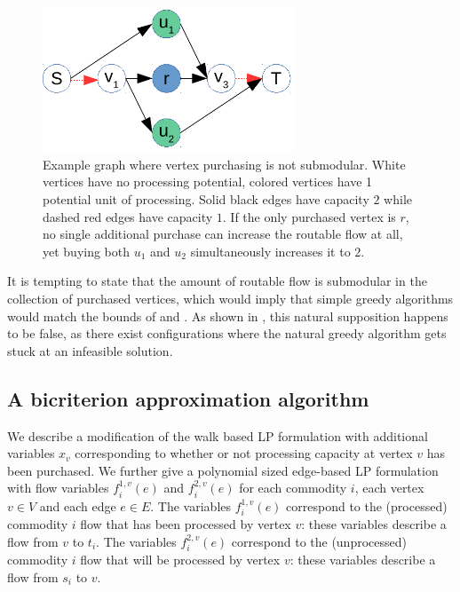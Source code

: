 \begin{figure}[t]
\centering
 \includegraphics[height=1.7in]{images/notsubmodular.pdf}
 \caption{Example graph where vertex purchasing is not submodular. White vertices have no processing potential, colored vertices have 1 potential unit of processing. Solid black edges have capacity $2$ while dashed red edges have capacity $1$. If the only purchased vertex is $r$, no single additional purchase can increase the routable flow at all, yet buying both $u_1$ and $u_2$ simultaneously increases it to $2$.}
\label{fig:notsubmodular}
\end{figure}

It is tempting to state that the amount of routable flow is submodular in the collection of purchased vertices, which would imply that simple greedy algorithms would match the bounds of  and . As shown in , this natural supposition happens to be false, as there exist configurations where the natural greedy algorithm gets stuck at an infeasible solution.

\subsection{A bicriterion approximation algorithm}
We describe a modification of the walk based LP formulation with additional 
variables $x_v$ corresponding to whether or not processing capacity at vertex $v$ has been purchased.
We further give a polynomial sized edge-based LP formulation with flow variables $f_i^{1,v}(e)$ and $f_i^{2,v}(e)$
for each commodity $i$, each vertex $v \in V$ and each edge $e \in E$. The variables $f_i^{1,v}(e)$ correspond
to the (processed) commodity $i$ flow that has been processed by vertex $v$: these variables describe a flow 
from $v$ to $t_i$. The variables $f_i^{2,v}(e)$ correspond
to the (unprocessed) commodity $i$ flow that will be processed by vertex $v$: these variables describe a flow 
from $s_i$ to $v$. 

